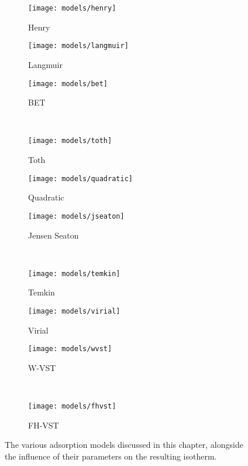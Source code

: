 \begin{figure}[p]
	\centering

	\begin{subfigure}{0.3\linewidth}
		\caption{Henry}\label{pyg:fig:henryex}%
		\texttt{[image: models/henry]}
	\end{subfigure}%
	\begin{subfigure}{0.3\linewidth}
		\caption{Langmuir}\label{pyg:fig:langmuirex}%
		\texttt{[image: models/langmuir]}
	\end{subfigure}%
	\begin{subfigure}{0.3\linewidth}
		\caption{BET}\label{pyg:fig:betex}%
		\texttt{[image: models/bet]}
	\end{subfigure}%
	\\
	\begin{subfigure}{0.3\linewidth}
		\caption{Toth}\label{pyg:fig:tothex}%
		\texttt{[image: models/toth]}
	\end{subfigure}%
	\begin{subfigure}{0.3\linewidth}
		\caption{Quadratic}\label{pyg:fig:quadraticex}%
		\texttt{[image: models/quadratic]}
	\end{subfigure}%
	\begin{subfigure}{0.3\linewidth}
		\caption{Jensen Seaton}\label{pyg:fig:jseatonex}%
		\texttt{[image: models/jseaton]}
	\end{subfigure}%
	\\
	\begin{subfigure}{0.3\linewidth}
		\caption{Temkin}\label{pyg:fig:temkinex}
		\texttt{[image: models/temkin]}
	\end{subfigure}%
	\begin{subfigure}{0.3\linewidth}
		\caption{Virial}\label{pyg:fig:virialex}%
		\texttt{[image: models/virial]}
	\end{subfigure}%
	\begin{subfigure}{0.3\linewidth}
		\caption{W-VST}\label{pyg:fig:wsvstex}%
		\texttt{[image: models/wvst]}
	\end{subfigure}%
	\\
	\begin{subfigure}{0.3\linewidth}
		\caption{FH-VST}\label{pyg:fig:fhvstex}%
		\texttt{[image: models/fhvst]}
	\end{subfigure}%

	\caption{The various adsorption models
		discussed in this chapter, alongside the influence
		of their parameters on the resulting isotherm.
	}\label{pyg:fig:modelex}
\end{figure}

